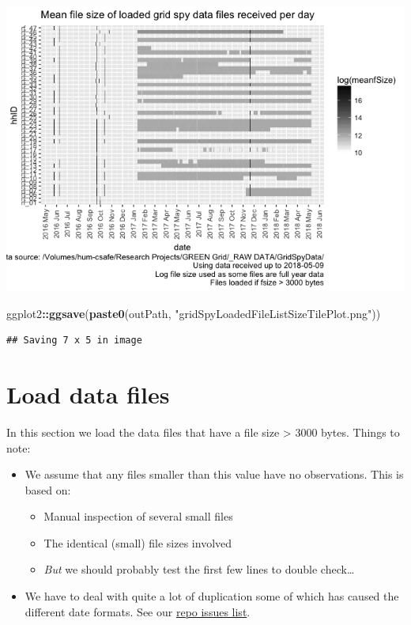 \documentclass[]{article}
\newenvironment{Shaded}{\begin{snugshade}}{\end{snugshade}}
\newcommand{\KeywordTok}[1]{\textcolor[rgb]{0.13,0.29,0.53}{\textbf{#1}}}
\newcommand{\StringTok}[1]{\textcolor[rgb]{0.31,0.60,0.02}{#1}}
\newcommand{\OperatorTok}[1]{\textcolor[rgb]{0.81,0.36,0.00}{\textbf{#1}}}
\newcommand{\NormalTok}[1]{#1}
\providecommand{\tightlist}{%
  \setlength{\itemsep}{0pt}\setlength{\parskip}{0pt}}
\begin{document}
\includegraphics{processNZGGElecCons1minData_files/figure-html/loadedFileSizesPlot-1.png}

\begin{Shaded}
\begin{Highlighting}[]
\NormalTok{ggplot2}\OperatorTok{::}\KeywordTok{ggsave}\NormalTok{(}\KeywordTok{paste0}\NormalTok{(outPath, }\StringTok{"gridSpyLoadedFileListSizeTilePlot.png"}\NormalTok{))}
\end{Highlighting}
\end{Shaded}

\begin{verbatim}
## Saving 7 x 5 in image
\end{verbatim}

\section{Load data files}\label{load-data-files}

In this section we load the data files that have a file size
\textgreater{} 3000 bytes. Things to note:

\begin{itemize}
\tightlist
\item
  We assume that any files smaller than this value have no observations.
  This is based on:

  \begin{itemize}
  \tightlist
  \item
    Manual inspection of several small files
  \item
    The identical (small) file sizes involved
  \item
    \emph{But} we should probably test the first few lines to double
    check\ldots{}
  \end{itemize}
\item
  We have to deal with quite a lot of duplication some of which has
  caused the different date formats. See our
  \href{https://git.soton.ac.uk/ba1e12/nzGREENGrid/issues?scope=all\&utf8=\%E2\%9C\%93\&state=all}{repo
  issues list}.
\end{itemize}
\end{document}
